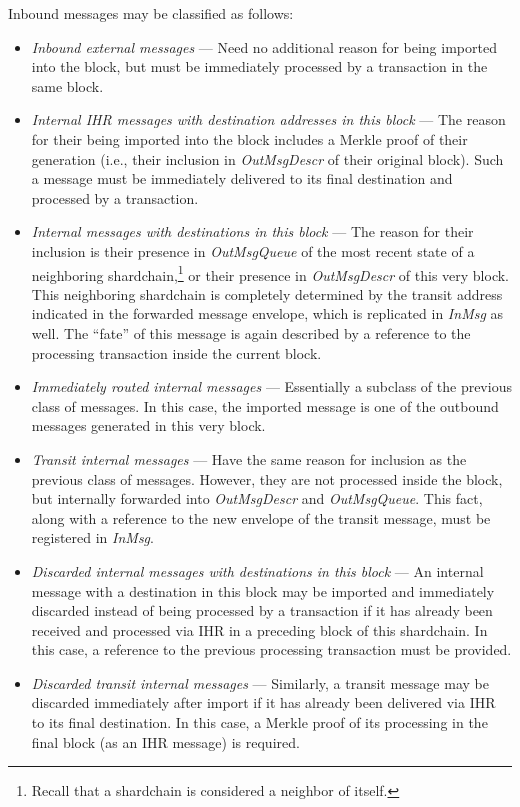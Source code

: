 \documentclass[12pt,oneside]{article}
\begin{document}
Inbound messages may be classified as follows:
\begin{itemize}
\item {\em Inbound external messages} --- Need no additional reason for being imported into the block, but must be immediately processed by a transaction in the same block.
\item {\em Internal IHR messages with destination addresses in this block} --- The reason for their being imported into the block includes a Merkle proof of their generation (i.e., their inclusion in {\em OutMsgDescr\/} of their original block). Such a message must be immediately delivered to its final destination and processed by a transaction.
\item {\em Internal messages with destinations in this block} --- The reason for their inclusion is their presence in {\em OutMsgQueue\/} of the most recent state of a neighboring shardchain,\footnote{Recall that a shardchain is considered a neighbor of itself.} or their presence in {\em OutMsgDescr} of this very block. This neighboring shardchain is completely determined by the transit address indicated in the forwarded message envelope, which is replicated in {\em InMsg\/} as well. The ``fate'' of this message is again described by a reference to the processing transaction inside the current block.
\item {\em Immediately routed internal messages} --- Essentially a subclass of the previous class of messages. In this case, the imported message is one of the outbound messages generated in this very block.
\item {\em Transit internal messages} --- Have the same reason for inclusion as the previous class of messages. However, they are not processed inside the block, but internally forwarded into {\em OutMsgDescr\/} and {\em OutMsgQueue}. This fact, along with a reference to the new envelope of the transit message, must be registered in {\em InMsg}.
\item {\em Discarded internal messages with destinations in this block} --- An internal message with a destination in this block may be imported and immediately discarded instead of being processed by a transaction if it has already been received and processed via IHR in a preceding block of this shardchain. In this case, a reference to the previous processing transaction must be provided.
\item {\em Discarded transit internal messages} --- Similarly, a transit message may be discarded immediately after import if it has already been delivered via IHR to its final destination. In this case, a Merkle proof of its processing in the final block (as an IHR message) is required.
\end{itemize}
\end{document}
